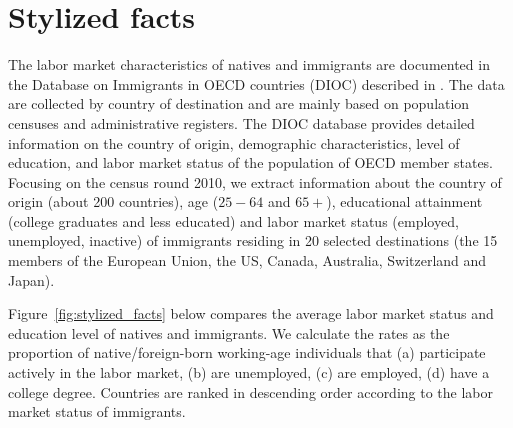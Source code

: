 \documentclass[a4paper,12pt]{article}
\begin{document}
\section{Stylized facts} \label{stylized_facts}

The labor market characteristics of natives and immigrants are documented in the Database on Immigrants in OECD countries (DIOC) described in \citet{Arslan2014}. The data are collected by country of destination and are mainly based on population censuses and administrative registers. The DIOC database provides detailed information on the country of origin, demographic characteristics, level of education, and labor market status of the population of OECD member states. Focusing on the census round 2010, we extract information about the country of origin (about 200 countries), age ($25-64$ and $65+$), educational attainment (college graduates and less educated) and labor market status (employed, unemployed, inactive) of immigrants residing in 20 selected destinations (the 15 members of the European Union, the US, Canada, Australia, Switzerland and Japan).

Figure~\ref{fig:stylized_facts} below compares the average labor market status and education level of natives and immigrants. We calculate the rates as the proportion of native/foreign-born working-age individuals that (a) participate actively in the labor market, (b) are unemployed, (c) are employed, (d) have a college degree. Countries are ranked in descending order according to the labor market status of immigrants. 
\end{document}
